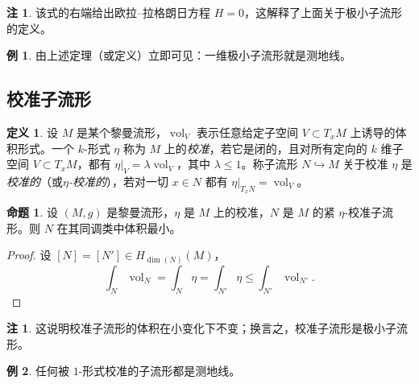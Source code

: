 \documentclass[11pt,a4paper]{article}
\theoremstyle{plain}
\theoremstyle{definition}
\newtheorem{definition}[theorem]{定义}
\newtheorem{remark}[theorem]{注}
\newtheorem*{example}{例}
\newtheorem*{propositionstar}{命题}
\begin{document}
\begin{remark}
该式的右端给出欧拉–拉格朗日方程 $H=0$，这解释了上面关于极小子流形的定义。
\end{remark}

\begin{example}
由上述定理（或定义）立即可见：一维极小子流形就是测地线。
\end{example}

\subsection{校准子流形}

\begin{definition}
设 $M$ 是某个黎曼流形，$\operatorname{vol}_V$ 表示任意给定子空间 $V\subset T_xM$ 上诱导的体积形式。一个 $k$-形式 $\eta$ 称为 $M$ 上的\emph{校准}，若它是闭的，且对所有定向的 $k$ 维子空间 $V\subset T_xM$，都有 $\eta|_V=\lambda\operatorname{vol}_V$，其中 $\lambda\le1$。称子流形 $N\hookrightarrow M$ 关于校准 $\eta$ 是\emph{校准的}（或\emph{$\eta$-校准的}），若对一切 $x\in N$ 都有 $\eta|_{T_xN}=\operatorname{vol}_V$。
\end{definition}

\begin{propositionstar}
设 $(M,g)$ 是黎曼流形，$\eta$ 是 $M$ 上的校准，$N$ 是 $M$ 的紧 $\eta$-校准子流形。则 $N$ 在其同调类中体积最小。
\end{propositionstar}

\begin{proof}
设 $[N]=[N']\in H_{\dim(N)}(M)$，
\[
\int_N\operatorname{vol}_N=\int_N\eta=\int_{N'}\eta\le\int_{N'}\operatorname{vol}_{N'}.
\]
\end{proof}

\begin{remark}
这说明校准子流形的体积在小变化下不变；换言之，校准子流形是极小子流形。
\end{remark}

\begin{example}
任何被 $1$-形式校准的子流形都是测地线。
\end{example}
\end{document}
